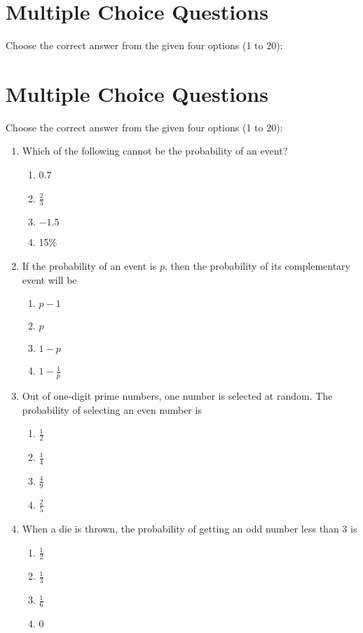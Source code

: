 \documentclass[a4paper, 12pt]{article}
\begin{document}
\begin{multicols}{2}	
	\section*{Multiple Choice Questions}
	Choose the correct answer from the given four options (1 to 20):
	
	
	
	\section*{Multiple Choice Questions}
	Choose the correct answer from the given four options (1 to 20):
	
	\begin{enumerate}
		\item Which of the following cannot be the probability of an event? 
		\begin{enumerate}
			\item 0.7
			\item $\frac{2}{3}$
			\item $-1.5$
			\item 15\%
		\end{enumerate}
		
		\item If the probability of an event is $p$, then the probability of its complementary event will be
		\begin{enumerate}
			\item $p - 1$
			\item $p$
			\item $1 - p$
			\item $1 - \frac{1}{p}$
		\end{enumerate}
		
		\item Out of one-digit prime numbers, one number is selected at random. The probability of selecting an even number is
		\begin{enumerate}
			\item $\frac{1}{2}$
			\item $\frac{1}{4}$
			\item $\frac{4}{9}$
			\item $\frac{2}{5}$
		\end{enumerate}
		
		\item When a die is thrown, the probability of getting an odd number less than 3 is
		\begin{enumerate}
			\item $\frac{1}{2}$
			\item $\frac{1}{3}$
			\item $\frac{1}{6}$
			\item 0
		\end{enumerate}
		

\end{enumerate}
\end{multicols}
\end{document}
